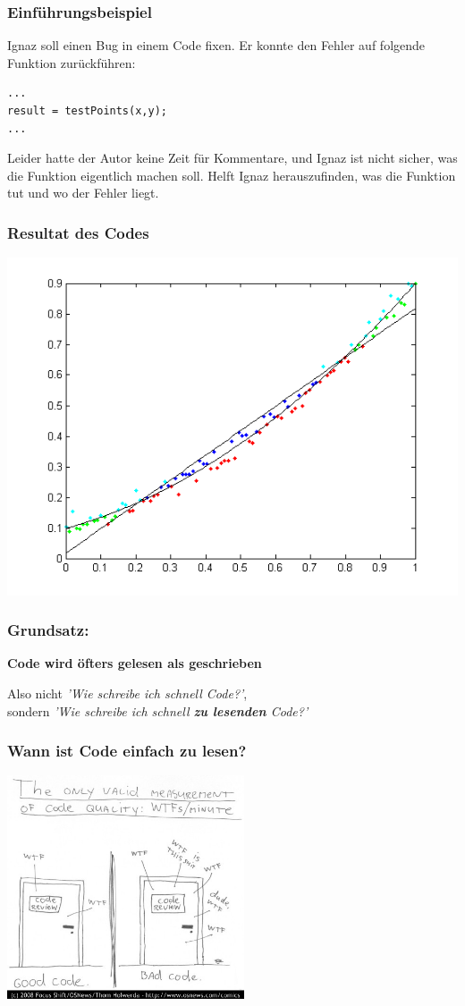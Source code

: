 \documentclass{beamer}
\begin{document}
\begin{frame}[fragile]
    \frametitle{Einführungsbeispiel}
    Ignaz soll einen Bug in einem Code fixen. Er konnte den Fehler auf folgende
    Funktion zurückführen:
\begin{lstlisting}
...
result = testPoints(x,y);
...
\end{lstlisting}
Leider hatte der Autor keine Zeit für Kommentare, und Ignaz ist nicht sicher,
was die Funktion eigentlich machen soll. Helft Ignaz herauszufinden,
was die Funktion  tut und wo der Fehler liegt.
\end{frame}

\begin{frame}
    \frametitle{Resultat des Codes}
    \begin{center}
        \includegraphics[width=0.8\linewidth]{GrafikResultat.png}
    \end{center}
\end{frame}


\begin{frame}
    \frametitle{Grundsatz:}
    \begin{center}
        \huge \bf Code wird öfters gelesen als geschrieben
    \end{center}
    \vspace{2em}\pause
    Also nicht \textit{'Wie schreibe ich schnell Code?'}, \\
    sondern \textit{'Wie schreibe ich schnell \textbf{zu lesenden} Code?'}
\end{frame}

\begin{frame}
    \frametitle{Wann ist Code einfach zu lesen?}
    \begin{center}
        \includegraphics[width=7cm]{wtfm.jpg}
    \end{center}
\end{frame}
\end{document}
